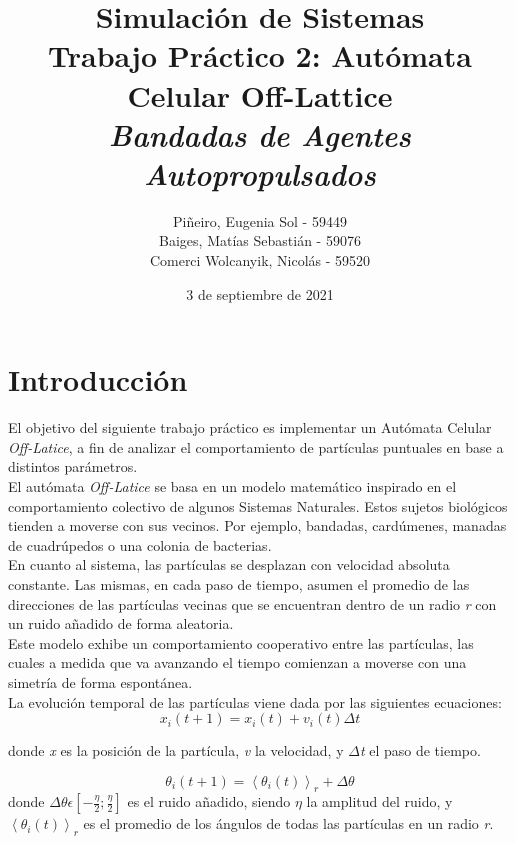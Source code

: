 \documentclass[12pt, a4paper]{report}
\title{%
\textbf{Simulación de Sistemas}\\
Trabajo Práctico 2: Autómata Celular Off-Lattice \\
\large \emph{Bandadas de Agentes Autopropulsados}
}
\author{Piñeiro, Eugenia Sol - 59449\\
Baiges, Matías Sebastián - 59076\\
Comerci Wolcanyik, Nicolás - 59520
}
\date{3 de septiembre de 2021}
\begin{document}
\maketitle

\tableofcontents
\newpage

\section{Introducción}
El objetivo del siguiente trabajo práctico es implementar un Autómata Celular \emph{Off-Latice}, 
a fin de analizar el comportamiento de partículas puntuales en base a distintos parámetros.\\

El autómata \emph{Off-Latice} se basa en un modelo matemático inspirado en el comportamiento colectivo de algunos Sistemas Naturales. Estos sujetos biológicos tienden a moverse con sus vecinos. Por ejemplo, bandadas, cardúmenes, manadas de cuadrúpedos o una colonia de bacterias.\cite{vicsek1995novel}\\

En cuanto al sistema, las partículas se desplazan con velocidad absoluta constante. Las mismas, en cada paso de tiempo, asumen el promedio de las direcciones de las partículas vecinas que se encuentran dentro de un radio \emph{r} con un ruido añadido de forma aleatoria.\\

Este modelo exhibe un comportamiento cooperativo entre las partículas, las cuales a medida que va avanzando el tiempo comienzan a moverse con una simetría de forma espontánea.\\ 

La evolución temporal de las partículas viene dada por las siguientes ecuaciones: 
\begin{equation}
\label{eq:velocity}
x_i(t+1) = x_i(t) + v_i(t) \Delta t 
\end{equation}

donde \emph{x} es la posición de la partícula, \emph{v} la velocidad, y $\Delta$\emph{t} el paso de tiempo.  

\begin{equation}
\label{eq:angle}
\theta _i(t+1) = \left\langle \theta _i(t)\right\rangle _r + \Delta \theta 
\end{equation}
donde $\Delta \theta  \epsilon  [-\frac{\eta}{2}; \frac{\eta}{2}]$ es el ruido añadido, siendo $\eta$ la amplitud del ruido, y \emph{$\left\langle \theta _i(t)\right\rangle _r$} es el promedio de los ángulos de todas las partículas en un radio \emph{r}.
\end{document}
